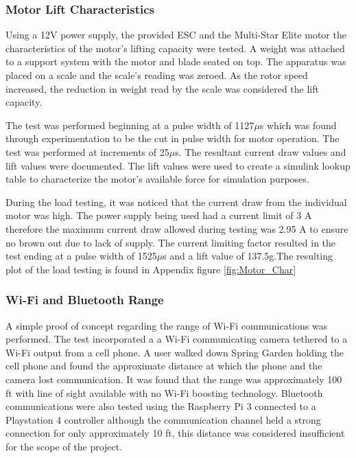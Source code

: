  \subsubsection{Motor Lift Characteristics}
 
 Using a 12V power supply, the provided ESC and the Multi-Star Elite motor the characteristics of the motor's lifting capacity were tested. A weight was attached to a support system with the motor and blade seated on top. The apparatus was placed on a scale and the scale's reading was zeroed. As the rotor speed increased, the reduction in weight read by the scale was considered the lift capacity.
 
 The test was performed beginning at a pulse width of 1127$\mu$s which was found through experimentation to be the cut in pulse width for motor operation. The test was performed at increments of 25$\mu$s. The resultant current draw values and lift values were documented. The lift values were used to create a simulink lookup table to characterize the motor's available force for simulation purposes. 
 
 During the load testing, it was noticed that the current draw from the individual motor was high. The power supply being used had a current limit of 3 A therefore the maximum current draw allowed during testing was 2.95 A to ensure no brown out due to lack of supply. The current limiting factor resulted in the test ending at a pulse width of 1525$\mu$s and a lift value of 137.5g.The resulting plot of the load testing is found in Appendix figure \ref{fig:Motor_Char}

  \subsubsection{Wi-Fi and Bluetooth Range}
  
  A simple proof of concept regarding the range of Wi-Fi communications was performed. The test incorporated a a Wi-Fi communicating camera tethered to a Wi-Fi output from a cell phone. A user walked down Spring Garden holding the cell phone and found the approximate distance at which the phone and the camera lost communication. It was found that the range was approximately 100 ft with line of sight available with no Wi-Fi boosting technology. Bluetooth communications were also tested using the Raspberry Pi 3 connected to a Playstation 4 controller although the communication channel held a strong connection for only approximately 10 ft, this distance was considered insufficient for the scope of the project.
  
